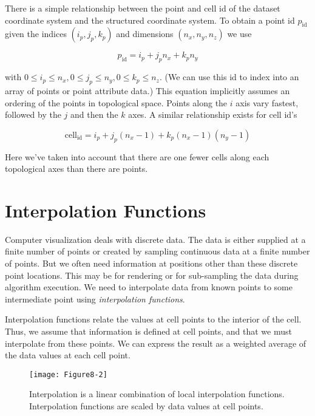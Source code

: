 There is a simple relationship between the point and cell id of the dataset coordinate system and the structured coordinate system. To obtain a point id $p_\text{id}$ given the indices $(i_p, j_p, k_p)$ and dimensions $(n_x, n_y, n_z)$ we use

\begin{equation}\label{eq:8.2}
p_\text{id} = i_p +j_p n_x + k_p n_y
\end{equation}

with $0 \leq i_p \leq n_x, 0 \leq j_p \leq n_y, 0 \leq k_p \leq n_z$. (We can use this id to index into an array of points or point attribute data.) This equation implicitly assumes an ordering of the points in topological space. Points along the $i$ axis vary fastest, followed by the $j$ and then the $k$ axes. A similar relationship exists for cell id's

\begin{equation}\label{eq:8.3}
\text{cell}_\text{id} = i_p + j_p (n_x - 1) + k_p (n_x - 1)(n_y - 1)
\end{equation}

Here we've taken into account that there are one fewer cells along each topological axes than there are points.

\section{Interpolation Functions}
\label{sec:interpolation_functions}

Computer visualization deals with discrete data. The data is either supplied at a finite number of points or created by sampling continuous data at a finite number of points. But we often need information at positions other than these discrete point locations. This may be for rendering or for sub-sampling the data during algorithm execution. We need to interpolate data from known points to some intermediate point using \emph{interpolation functions}.

Interpolation functions relate the values at cell points to the interior of the cell. Thus, we assume that information is defined at cell points, and that we must interpolate from these points. We can express the result as a weighted average of the data values at each cell point.

\begin{figure}[!htb]
    \centering
    \texttt{[image: Figure8-2]}\\
    \caption{Interpolation is a linear combination of local interpolation functions. Interpolation functions are scaled by data values at cell points.}\label{fig:Figure8-2}
\end{figure}

